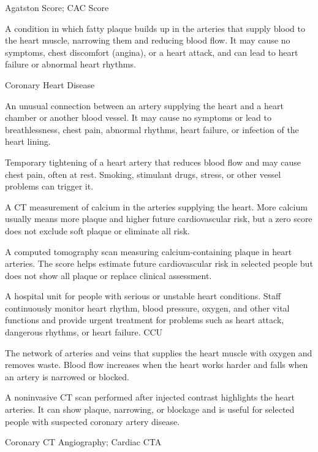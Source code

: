 \synonyms
Agatston Score; CAC Score

 A condition in which fatty plaque builds up in the arteries that supply blood to the heart muscle, narrowing them and reducing blood flow. It may cause no symptoms, chest discomfort (angina), or a heart attack, and can lead to heart failure or abnormal heart rhythms.

\synonyms
Coronary Heart Disease

 An unusual connection between an artery supplying the heart and a heart chamber or another blood vessel. It may cause no symptoms or lead to breathlessness, chest pain, abnormal rhythms, heart failure, or infection of the heart lining.

 Temporary tightening of a heart artery that reduces blood flow and may cause chest pain, often at rest. Smoking, stimulant drugs, stress, or other vessel problems can trigger it.

 A CT measurement of calcium in the arteries supplying the heart. More calcium usually means more plaque and higher future cardiovascular risk, but a zero score does not exclude soft plaque or eliminate all risk.

 A computed tomography scan measuring calcium-containing plaque in heart arteries. The score helps estimate future cardiovascular risk in selected people but does not show all plaque or replace clinical assessment.

 A hospital unit for people with serious or unstable heart conditions. Staff continuously monitor heart rhythm, blood pressure, oxygen, and other vital functions and provide urgent treatment for problems such as heart attack, dangerous rhythms, or heart failure.
\synonyms
CCU

 The network of arteries and veins that supplies the heart muscle with oxygen and removes waste. Blood flow increases when the heart works harder and falls when an artery is narrowed or blocked.

 A noninvasive CT scan performed after injected contrast highlights the heart arteries. It can show plaque, narrowing, or blockage and is useful for selected people with suspected coronary artery disease.

\synonyms
Coronary CT Angiography; Cardiac CTA

